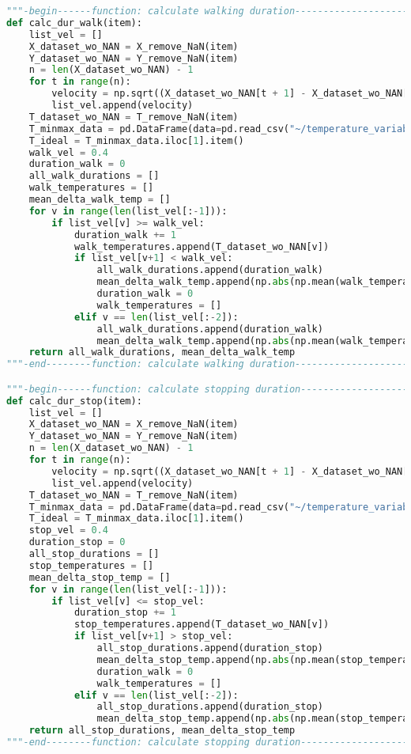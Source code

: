 \begin{lstlisting}[language=Python, basicstyle=\tiny, frame=single, keywordstyle=\color{teal}, commentstyle=\color{olive}, stringstyle=\color{red}]
"""-begin------function: calculate walking duration--------------------------"""
def calc_dur_walk(item):
    list_vel = []
    X_dataset_wo_NAN = X_remove_NaN(item)
    Y_dataset_wo_NAN = Y_remove_NaN(item)
    n = len(X_dataset_wo_NAN) - 1
    for t in range(n):
        velocity = np.sqrt((X_dataset_wo_NAN[t + 1] - X_dataset_wo_NAN[t]) ** 2 + (Y_dataset_wo_NAN[t + 1] - Y_dataset_wo_NAN[t]) ** 2)
        list_vel.append(velocity)
    T_dataset_wo_NAN = T_remove_NaN(item)
    T_minmax_data = pd.DataFrame(data=pd.read_csv("~/temperature_variables.csv"), columns=[item])
    T_ideal = T_minmax_data.iloc[1].item()
    walk_vel = 0.4
    duration_walk = 0
    all_walk_durations = []
    walk_temperatures = []
    mean_delta_walk_temp = []
    for v in range(len(list_vel[:-1])):
        if list_vel[v] >= walk_vel:
            duration_walk += 1
            walk_temperatures.append(T_dataset_wo_NAN[v])
            if list_vel[v+1] < walk_vel:
                all_walk_durations.append(duration_walk)
                mean_delta_walk_temp.append(np.abs(np.mean(walk_temperatures) - T_ideal))
                duration_walk = 0
                walk_temperatures = []
            elif v == len(list_vel[:-2]):
                all_walk_durations.append(duration_walk)
                mean_delta_walk_temp.append(np.abs(np.mean(walk_temperatures) - T_ideal))
    return all_walk_durations, mean_delta_walk_temp
"""-end--------function: calculate walking duration--------------------------"""

"""-begin------function: calculate stopping duration-------------------------"""
def calc_dur_stop(item):
    list_vel = []
    X_dataset_wo_NAN = X_remove_NaN(item)
    Y_dataset_wo_NAN = Y_remove_NaN(item)
    n = len(X_dataset_wo_NAN) - 1
    for t in range(n):
        velocity = np.sqrt((X_dataset_wo_NAN[t + 1] - X_dataset_wo_NAN[t]) ** 2 + (Y_dataset_wo_NAN[t + 1] - Y_dataset_wo_NAN[t]) ** 2)
        list_vel.append(velocity)
    T_dataset_wo_NAN = T_remove_NaN(item)
    T_minmax_data = pd.DataFrame(data=pd.read_csv("~/temperature_variables.csv"), columns=[item])
    T_ideal = T_minmax_data.iloc[1].item()
    stop_vel = 0.4
    duration_stop = 0
    all_stop_durations = []
    stop_temperatures = []
    mean_delta_stop_temp = []
    for v in range(len(list_vel[:-1])):
        if list_vel[v] <= stop_vel:
            duration_stop += 1
            stop_temperatures.append(T_dataset_wo_NAN[v])
            if list_vel[v+1] > stop_vel:
                all_stop_durations.append(duration_stop)
                mean_delta_stop_temp.append(np.abs(np.mean(stop_temperatures) - T_ideal))
                duration_walk = 0
                walk_temperatures = []
            elif v == len(list_vel[:-2]):
                all_stop_durations.append(duration_stop)
                mean_delta_stop_temp.append(np.abs(np.mean(stop_temperatures) - T_ideal))
    return all_stop_durations, mean_delta_stop_temp
"""-end--------function: calculate stopping duration-------------------------"""


\end{lstlisting}
